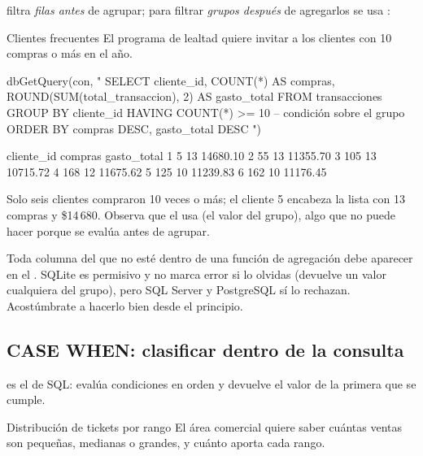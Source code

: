  filtra \emph{filas antes} de agrupar; para filtrar
\emph{grupos después} de agregarlos se usa :

\begin{ejemplo}{Clientes frecuentes}
El programa de lealtad quiere invitar a los clientes con 10 compras o más en
el año.
\end{ejemplo}

\begin{rcode}
dbGetQuery(con, "
  SELECT cliente_id,
         COUNT(*)                         AS compras,
         ROUND(SUM(total_transaccion), 2) AS gasto_total
  FROM transacciones
  GROUP BY cliente_id
  HAVING COUNT(*) >= 10      -- condición sobre el grupo
  ORDER BY compras DESC, gasto_total DESC
")
\end{rcode}

\begin{rsalida}
  cliente_id compras gasto_total
1          5      13    14680.10
2         55      13    11355.70
3        105      13    10715.72
4        168      12    11675.62
5        125      10    11239.83
6        162      10    11176.45
\end{rsalida}

Solo seis clientes compraron 10 veces o más; el cliente 5 encabeza la lista
con 13 compras y \$14\,680. Observa que el  usa
 (el valor del grupo), algo que  no puede
hacer porque se evalúa antes de agrupar.

\begin{advertencia}
Toda columna del  que no esté dentro de una función de
agregación debe aparecer en el . SQLite es permisivo y no
marca error si lo olvidas (devuelve un valor cualquiera del grupo), pero SQL
Server y PostgreSQL sí lo rechazan. Acostúmbrate a hacerlo bien desde el
principio.
\end{advertencia}

\subsection{CASE WHEN: clasificar dentro de la consulta}

 es el  de SQL: evalúa condiciones en
orden y devuelve el valor de la primera que se cumple.

\begin{ejemplo}{Distribución de tickets por rango}
El área comercial quiere saber cuántas ventas son pequeñas, medianas o
grandes, y cuánto aporta cada rango.
\end{ejemplo}

